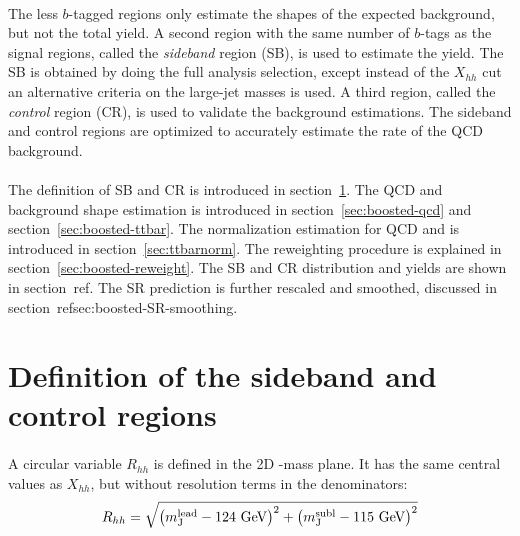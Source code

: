\paragraph{}
The less $b$-tagged regions only estimate the shapes of the expected background, but not the total yield.
A second region with the same number of $b$-tags as the signal regions, called the \textit{sideband} region (SB), is used to estimate the yield.
The SB is obtained by doing the full analysis selection, except instead of the $X_{hh}$ cut an alternative criteria on the large-\R jet masses is used.
A third region, called the \textit{control} region (CR), is used to validate the background estimations.
The sideband and control regions are optimized to accurately estimate the rate of the QCD background. 

\paragraph{}
The definition of SB and CR is introduced in section~\ref{sec:boosted-SBCR}.
The QCD and \ttbar~  background shape estimation is introduced in section~\ref{sec:boosted-qcd} and section~\ref{sec:boosted-ttbar}.
The normalization estimation for QCD and \ttbar is introduced in section~\ref{sec:ttbarnorm}.
The reweighting procedure is explained in section~\ref{sec:boosted-reweight}.
The SB and CR distribution and yields are shown in section~ref{}.
The SR prediction is further rescaled and smoothed, discussed in section~ref{sec:boosted-SR-smoothing}.


\section{Definition of the sideband and control regions}
\label{sec:boosted-SBCR}

\paragraph{}
A circular variable $R_{hh}$ is defined in the 2D \mleadJ-\msublJ mass plane. 
It has the same central values as $X_{hh}$, but without resolution terms in the denominators:
\begin{equation}
\label{eq:boosted_RhhDef}
R_{hh} = \sqrt{\left(m^{\rm lead}_{\rm J} - \text{124 GeV}\right)^2 + \left(m^{\rm subl}_{\rm J} - \text{115 GeV}\right)^2}
\end{equation}

